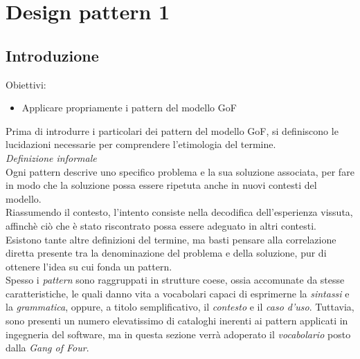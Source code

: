 \documentclass{article}
\begin{document}
\pagestyle{empty}
\section*{Design pattern 1}
\large

\subsection*{Introduzione}
\large
Obiettivi:
\begin{itemize}
    \renewcommand{\labelitemi}{-}
    \itemsep0em
    \item Applicare propriamente i pattern del modello GoF 
\end{itemize}
Prima di introdurre i particolari dei pattern del modello GoF, si definiscono le lucidazioni necessarie per comprendere l'etimologia del termine.\vspace*{14pt}\\
\textit{Definizione informale}\\
Ogni pattern descrive uno specifico problema e la sua soluzione associata, per fare in modo che la soluzione possa essere ripetuta anche in nuovi contesti del modello.\vspace*{14pt}\\
Riassumendo il contesto, l'intento consiste nella decodifica dell'esperienza vissuta, affinchè ciò che è stato riscontrato possa essere adeguato in altri contesti. Esistono tante altre definizioni del termine, ma basti pensare alla correlazione diretta presente tra la denominazione del problema e della soluzione, pur di ottenere l'idea su cui fonda un pattern.\vspace*{14pt}\\
Spesso i \textit{pattern} sono raggruppati in strutture coese, ossia accomunate da stesse caratteristiche, le quali danno vita a vocabolari capaci di esprimerne la \textit{sintassi} e la \textit{grammatica}, oppure, a titolo semplificativo, il \textit{contesto} e il \textit{caso d'uso}. Tuttavia, sono presenti un numero elevatissimo di cataloghi inerenti ai pattern applicati in ingegneria del software, ma in questa sezione verrà adoperato il \textit{vocabolario} posto dalla \textit{Gang of Four}.
\end{document}
